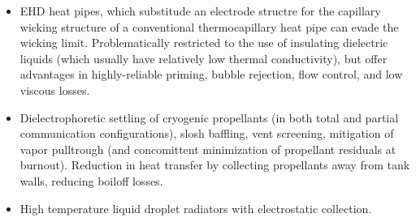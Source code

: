 \documentclass[10pt,a4paper]{article}
\begin{document}
\begin{itemize}
\item EHD heat pipes, which substitude an electrode structre for the capillary wicking structure of a conventional thermocapillary heat pipe can evade the wicking limit. Problematically restricted to the use of insulating dielectric liquids (which usually have relatively low thermal conductivity), but offer advantages in highly-reliable priming, bubble rejection, flow control, and low viscous losses.

\item Dielectrophoretic settling of cryogenic propellants (in both total and partial communication configurations), slosh baffling, vent screening, mitigation of vapor pulltrough (and concomittent minimization of propellant residuals at burnout). Reduction in heat transfer by collecting propellants away from tank walls, reducing boiloff losses.

\item High temperature liquid droplet radiators with electrostatic collection.
\end{itemize}
\end{document}
